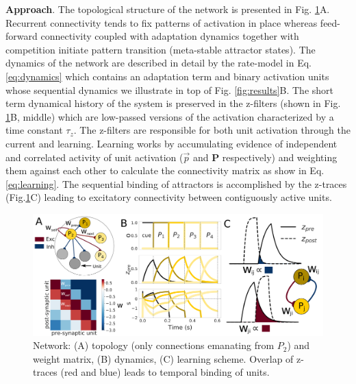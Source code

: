 \documentclass[12pt, a4paper]{article}
\begin{document}
\textbf{Approach}. The topological structure of the network is presented in Fig. \ref{fig:model}A. Recurrent connectivity tends to fix patterns of activation in place whereas feed-forward connectivity coupled with adaptation dynamics together with competition initiate pattern transition (meta-stable attractor states). The dynamics of the network are described in detail by the rate-model in Eq. \ref{eq:dynamics} which contains an adaptation term and binary activation units whose sequential dynamics we illustrate in top of Fig. \ref{fig:results}B. The short term dynamical history of the system is preserved in the z-filters (shown in Fig. \ref{fig:model}B, middle) which are low-passed versions of the activation characterized by a time constant $\tau_z$. The z-filters are responsible for both unit activation through the current and learning. Learning works by accumulating evidence of independent and correlated activity of unit activation ($\vec{p}$ and $\mathbf{P}$ respectively) and weighting them against each other to calculate the connectivity matrix as show in Eq. \ref{eq:learning}. The sequential binding of attractors is accomplished by the z-traces (Fig.\ref{fig:model}C) leading to excitatory connectivity  between  contiguously active units. 


\begin{figure}[H]
\centering
\includegraphics[scale=0.29]{model.png}
\caption{Network: (A) topology (only connections emanating from $P_2$) and weight matrix, (B) dynamics, (C) learning scheme. Overlap of z-traces (red and blue) leads to temporal binding of units.}
\label{fig:model}
\end{figure}

\end{document}
